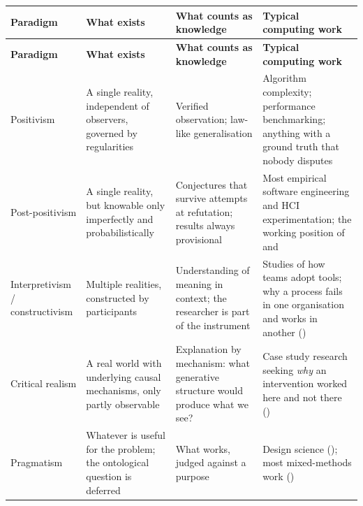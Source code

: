 \begin{center}
\small
\begin{longtable}{@{}L{2.5cm}L{3.5cm}L{3.5cm}L{4.2cm}@{}}
\toprule
\textbf{Paradigm} & \textbf{What exists} & \textbf{What counts as knowledge} &
\textbf{Typical computing work} \\
\midrule
\endfirsthead
\toprule
\textbf{Paradigm} & \textbf{What exists} & \textbf{What counts as knowledge} &
\textbf{Typical computing work} \\
\midrule
\endhead
\bottomrule
\endfoot
Positivism
  & A single reality, independent of observers, governed by regularities
  & Verified observation; law-like generalisation
  & Algorithm complexity; performance benchmarking; anything with a
    ground truth that nobody disputes \\
Post-positivism
  & A single reality, but knowable only imperfectly and probabilistically
  & Conjectures that survive attempts at refutation; results always provisional
  & Most empirical software engineering and HCI experimentation; the working
    position of  and  \\
Interpretivism / constructivism
  & Multiple realities, constructed by participants
  & Understanding of meaning in context; the researcher is part of the
    instrument
  & Studies of how teams adopt tools; why a process fails in one organisation
    and works in another () \\
Critical realism
  & A real world with underlying causal mechanisms, only partly observable
  & Explanation by mechanism: what generative structure would produce what we
    see?
  & Case study research seeking \emph{why} an intervention worked here and not
    there () \\
Pragmatism
  & Whatever is useful for the problem; the ontological question is deferred
  & What works, judged against a purpose
  & Design science (); most mixed-methods work
    () \\
\end{longtable}
\end{center}

